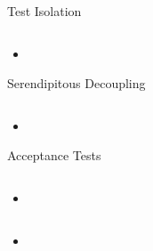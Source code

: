\documentclass{beamer}
\begin{document}
\begin{frame}[fragile]{Test Isolation}


\begin{lstlisting}[language=Java]

\end{lstlisting}

\begin{itemize}
\item
\end{itemize}


\end{frame}

\begin{frame}[fragile]{Serendipitous Decoupling}


\begin{lstlisting}[language=Java]

\end{lstlisting}

\begin{itemize}
\item
\end{itemize}


\end{frame}

\begin{frame}[fragile]{Acceptance Tests}


\begin{lstlisting}[language=Java]

\end{lstlisting}

\begin{itemize}
\item
\end{itemize}


\end{frame}

\begin{frame}[fragile]{}


\begin{lstlisting}[language=Java]

\end{lstlisting}

\begin{itemize}
\item
\end{itemize}


\end{frame}
\end{document}
